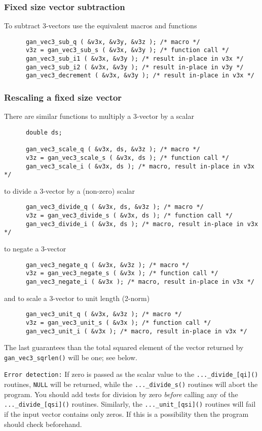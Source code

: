 \subsubsection{Fixed size vector subtraction}
To subtract 3-vectors use the equivalent macros and functions
\begin{verbatim}
      gan_vec3_sub_q ( &v3x, &v3y, &v3z ); /* macro */
      v3z = gan_vec3_sub_s ( &v3x, &v3y ); /* function call */
      gan_vec3_sub_i1 ( &v3x, &v3y ); /* result in-place in v3x */
      gan_vec3_sub_i2 ( &v3x, &v3y ); /* result in-place in v3y */
      gan_vec3_decrement ( &v3x, &v3y ); /* result in-place in v3x */
\end{verbatim}

\subsubsection{Rescaling a fixed size vector}
There are similar functions to multiply a 3-vector by a scalar
\begin{verbatim}
      double ds;

      gan_vec3_scale_q ( &v3x, ds, &v3z ); /* macro */
      v3z = gan_vec3_scale_s ( &v3x, ds ); /* function call */
      gan_vec3_scale_i ( &v3x, ds ); /* macro, result in-place in v3x */
\end{verbatim}
to divide a 3-vector by a (non-zero) scalar
\begin{verbatim}
      gan_vec3_divide_q ( &v3x, ds, &v3z ); /* macro */
      v3z = gan_vec3_divide_s ( &v3x, ds ); /* function call */
      gan_vec3_divide_i ( &v3x, ds ); /* macro, result in-place in v3x */
\end{verbatim}
to negate a 3-vector
\begin{verbatim}
      gan_vec3_negate_q ( &v3x, &v3z ); /* macro */
      v3z = gan_vec3_negate_s ( &v3x ); /* function call */
      gan_vec3_negate_i ( &v3x ); /* macro, result in-place in v3x */
\end{verbatim}
and to scale a 3-vector to unit length (2-norm)
\begin{verbatim}
      gan_vec3_unit_q ( &v3x, &v3z ); /* macro */
      v3z = gan_vec3_unit_s ( &v3x ); /* function call */
      gan_vec3_unit_i ( &v3x ); /* macro, result in-place in v3x */
\end{verbatim}
The last guarantees than the total squared element of the vector
returned by {\tt gan\_vec3\_sqrlen()} will be one; see below.

{\tt Error detection:} If zero is passed as the scalar value to the
{\tt ...\_divide\_[qi]()} routines, {\tt NULL} will be returned, while the
{\tt ...\_divide\_s()} routines will abort the program. You should add tests
for division by zero {\em before} calling any of the {\tt ...\_divide\_[qsi]()}
routines. Similarly, the {\tt ...\_unit\_[qsi]()} routines will fail if
the input vector contains only zeros. If this is a possibility then the
program should check beforehand.

